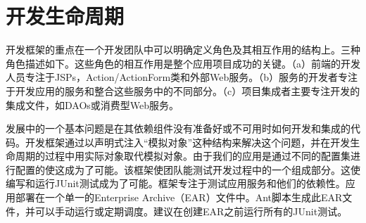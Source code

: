 
\chapter{开发生命周期}
开发框架的重点在一个开发团队中可以明确定义角色及其相互作用的结构上。三种角色描述如下。这些角色的相互作用是整个应用项目成功的关键。（a）前端的开发人员专注于JSPs，Action/ActionForm类和外部Web服务。（b）服务的开发者专注于开发应用的服务和整合这些服务中的不同部分。（c）项目集成者主要专注开发的集成文件，如DAOs或消费型Web服务。

发展中的一个基本问题是在其依赖组件没有准备好或不可用时如何开发和集成的代码。开发框架通过以声明式注入“模拟对象”这种结构来解决这个问题，并在开发生命周期的过程中用实际对象取代模拟对象。由于我们的应用是通过不同的配置集进行配置的使这成为了可能。该框架使团队能测试开发过程中的一个组成部分。这使编写和运行JUnit测试成为了可能。框架专注于测试应用服务和他们的依赖性。应用部署在一个单一的Enterprise Archive（EAR）文件中。Ant脚本生成此EAR文件，并可以手动运行或定期调度。建议在创建EAR之前运行所有的JUnit测试。

